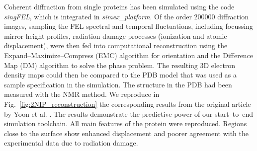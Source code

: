 \documentclass[10pt]{scrartcl}
\begin{document}
Coherent diffraction from single proteins has been simulated using the
code \textit{singFEL}, which is integrated in \textit{simex\_platform}.
Of the order 200000 diffraction images,
sampling the FEL spectral and temporal fluctuations, including focussing
mirror height profiles, radiation damage processes (ionization and atomic
displacement), were then fed into computational reconstruction using the
Expand--Maximize--Compress (EMC) algorithm for orientation and the
Difference Map (DM) algorithm to solve the phase problem. The resulting 3D
electron density maps could then be compared to the PDB model that was used as
a sample specification in the simulation. The structure in the PDB had been
measured with the NMR method. We reproduce in Fig.~\ref{fig:2NIP_reconstruction}
the corresponding results from the original article by Yoon et al.
\cite{Yoon2016}.
The results demonstrate the predictive power of our start--to--end simulation
toolchain. All main features of the protein were reproduced. Regions close to
the surface show enhanced displacement and poorer agreement with the
experimental data due to radiation damage.
%
\end{document}
